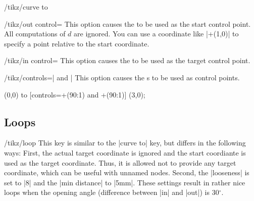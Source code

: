 \begin{key}{/tikz/curve to}
\begin{key}{/tikz/out control=}
    This option causes the  to be used as the start
    control point. All computations of $d$ are ignored. You can use a
    coordinate like |+(1,0)| to specify a point relative to the start
    coordinate.
  \end{key}
  \begin{key}{/tikz/in control=}
    This option causes the  to be used as the target
    control point.
  \end{key}
  \begin{key}{/tikz/controls=| and |}
    This option causes the s to be used as control
    points. 
\begin{codeexample}[]
\tikz \draw (0,0) to [controls=+(90:1) and +(90:1)] (3,0);
\end{codeexample}
  \end{key}
\end{key}


\subsection{Loops}

\begin{key}{/tikz/loop}
  This key is similar to the |curve to| key, but differs in the
  following ways: First, the actual target coordinate is ignored and the
  start coordiante is used as the target coordinate. Thus, it is
  allowed not to provide any target coordinate, which can be useful
  with unnamed nodes. Second, the |looseness| is set to |8| and the
  |min distance| to |5mm|. These settings result in rather nice loops
  when the opening angle (difference between |in| and |out|) is
  30$^\circ$.
\begin{codeexample}[]
\end{codeexample}
\end{key}


